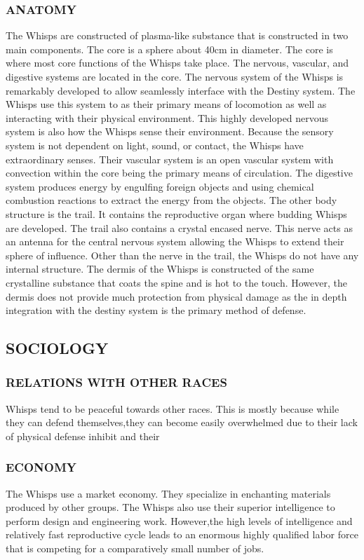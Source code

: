 \subsubsection{ANATOMY}
The Whisps are constructed of plasma-like substance that is constructed in two main components.  The core is a sphere about 40cm in diameter.  The core is where most core functions of the Whisps take place.  The nervous, vascular, and digestive systems are located in the core.  The nervous system of the Whisps is remarkably developed to allow seamlessly interface with the Destiny system.  The Whisps use this system to as their primary means of locomotion as well as interacting with their physical environment.  This highly developed nervous system is also how the Whisps sense their environment.  Because the sensory system is not dependent on light, sound, or contact, the Whisps have extraordinary senses.  Their vascular system is an open vascular system with convection within the core being the primary means of circulation.  The digestive system produces energy by engulfing foreign objects and using chemical combustion reactions to extract the energy from the objects.  The other body structure is the trail.  It contains the reproductive organ where budding Whisps are developed.  The trail also contains a crystal encased nerve.  This nerve acts as an antenna for the central nervous system allowing the Whisps to extend their sphere of influence.  Other than the nerve in the trail, the Whisps do not have any internal structure.  The dermis of the Whisps is constructed of the same crystalline substance that coats the spine and is hot to the touch.  However, the dermis does not provide much protection from physical damage as the in depth integration with the destiny system is the primary method of defense.
\subsection{SOCIOLOGY}
\subsubsection{RELATIONS WITH OTHER RACES}
Whisps tend to be peaceful towards other races.  This is mostly because while they can defend themselves,they can become easily overwhelmed due to their lack of physical defense inhibit and their 
\subsubsection{ECONOMY}
The Whisps use a market economy.  They specialize in enchanting materials produced by other groups.  The Whisps also use their superior intelligence to perform design and engineering work.  However,the high levels of intelligence and relatively fast reproductive cycle leads to an enormous highly qualified labor force that is competing for a comparatively small number of jobs.
